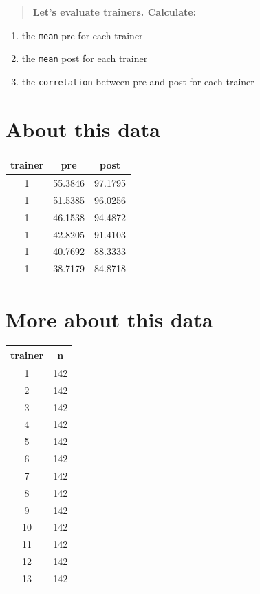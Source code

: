 \documentclass[
]{book}
\providecommand{\tightlist}{%
  \setlength{\itemsep}{0pt}\setlength{\parskip}{0pt}}
\begin{document}
\begin{quote}
\textbf{Let's evaluate trainers. Calculate:}
\end{quote}

\begin{enumerate}
\def\labelenumi{\arabic{enumi}.}
\tightlist
\item
  the \texttt{mean} pre for each trainer
\item
  the \texttt{mean} post for each trainer
\item
  the \texttt{correlation} between pre and post for each trainer
\end{enumerate}

\hypertarget{about-this-data}{%
\section{About this data}\label{about-this-data}}

\begin{tabular}{c|c|c}
\hline
trainer & pre & post\\
\hline
1 & 55.3846 & 97.1795\\
\hline
1 & 51.5385 & 96.0256\\
\hline
1 & 46.1538 & 94.4872\\
\hline
1 & 42.8205 & 91.4103\\
\hline
1 & 40.7692 & 88.3333\\
\hline
1 & 38.7179 & 84.8718\\
\hline
\end{tabular}

\hypertarget{more-about-this-data}{%
\section{More about this data}\label{more-about-this-data}}

\begin{tabular}{c|c}
\hline
trainer & n\\
\hline
1 & 142\\
\hline
2 & 142\\
\hline
3 & 142\\
\hline
4 & 142\\
\hline
5 & 142\\
\hline
6 & 142\\
\hline
7 & 142\\
\hline
8 & 142\\
\hline
9 & 142\\
\hline
10 & 142\\
\hline
11 & 142\\
\hline
12 & 142\\
\hline
13 & 142\\
\hline
\end{tabular}
\end{document}
